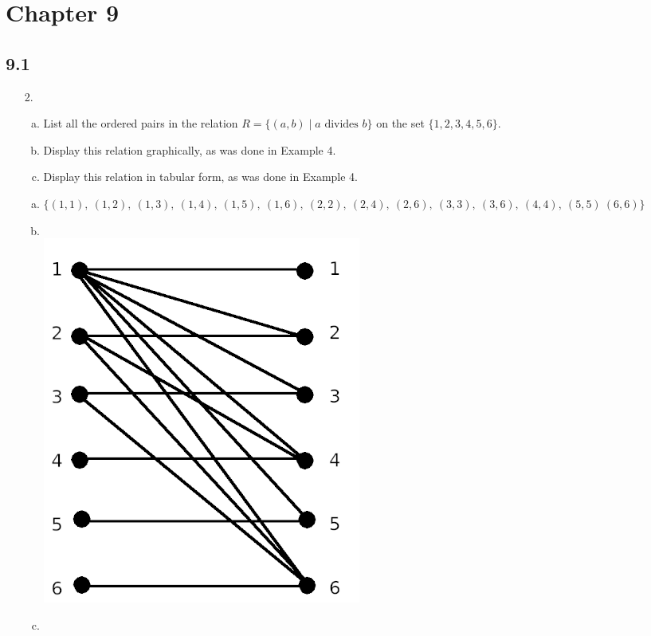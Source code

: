\section{Chapter 9}
\subsection{9.1}
\begin{itemize}
    \item[2.]
          \begin{enumerate}[a.]
              \item List all the ordered pairs in the relation $R = \{(a, b) \mid a \text{ divides } b\}$ on the set $\{1, 2, 3, 4, 5, 6\}$.
              \item Display this relation graphically, as was done in Example 4.
              \item Display this relation in tabular form, as was done in Example 4.
          \end{enumerate}
          \answer
          \begin{enumerate}[a.]
              \item $\{(1,1),\ (1,2),\ (1,3),\ (1,4),\ (1,5),\ (1,6),\ (2,2),\ (2,4),\ (2,6),\ (3,3),\ (3,6),\ (4,4),\ (5,5)\ (6,6)\}$
              \item \text{}\\
              \includegraphics[scale=0.6]{img/9_1_2_graph.png}
              \item \begin{tabular}{r|*{6}{c}}

\end{tabular}
\end{enumerate}
\end{itemize}
